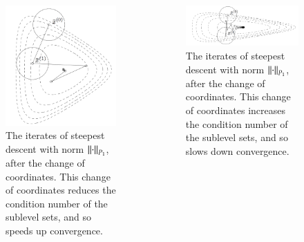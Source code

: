 \begin{frame}
{\begin{columns}
  \begin{column}{0.5\textwidth}
    \begin{figure}[bh!]
      \centering
      \includegraphics[scale=0.16]{pics/914.png}
      \caption{\tiny The iterates of steepest descent with norm $\left\lVert\cdot\right\rVert_{P_1}$, after the change of coordinates. This change of coordinates reduces the condition number of the sublevel sets, and so speeds up convergence.}
    \end{figure}
  \end{column}

  \begin{column}{0.5\textwidth}
    \begin{figure}[bh!]
      \centering
      \includegraphics[scale=0.16]{pics/915.png}
      \caption{\tiny The iterates of steepest descent with norm $\left\lVert\cdot\right\rVert_{P_1}$, after the change of coordinates. This change of coordinates increases the condition number of the sublevel sets, and so slows down convergence.}
    \end{figure}
  \end{column}
\end{columns}
}
\end{frame}
